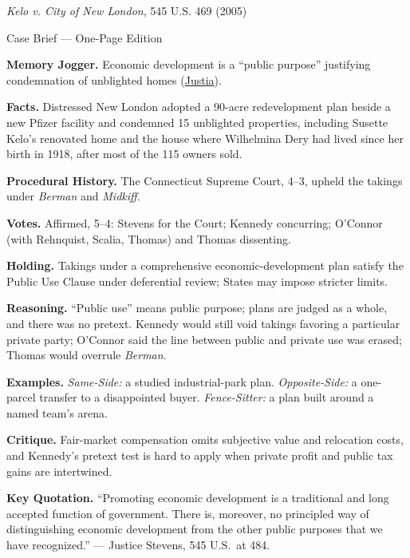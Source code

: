 \documentclass[12pt]{article}
\begin{document}
\begin{center}
{\Large \textit{Kelo v. City of New London}, 545 U.S. 469 (2005)\par}
\vspace{0.3em}
{\normalsize Case Brief --- One-Page Edition\par}
\end{center}

\textbf{Memory Jogger.} Economic development is a ``public purpose'' justifying condemnation of unblighted homes (\href{https://supreme.justia.com/cases/federal/us/545/469/}{Justia}).

\textbf{Facts.} Distressed New London adopted a 90-acre redevelopment plan beside a new Pfizer facility and condemned 15 unblighted properties, including Susette Kelo's renovated home and the house where Wilhelmina Dery had lived since her birth in 1918, after most of the 115 owners sold.

\textbf{Procedural History.} The Connecticut Supreme Court, 4--3, upheld the takings under \textit{Berman} and \textit{Midkiff}.

\textbf{Votes.} Affirmed, 5--4: Stevens for the Court; Kennedy concurring; O'Connor (with Rehnquist, Scalia, Thomas) and Thomas dissenting.

\textbf{Holding.} Takings under a comprehensive economic-development plan satisfy the Public Use Clause under deferential review; States may impose stricter limits.

\textbf{Reasoning.} ``Public use'' means public purpose; plans are judged as a whole, and there was no pretext. Kennedy would still void takings favoring a particular private party; O'Connor said the line between public and private use was erased; Thomas would overrule \textit{Berman}.

\textbf{Examples.} \emph{Same-Side:} a studied industrial-park plan. \emph{Opposite-Side:} a one-parcel transfer to a disappointed buyer. \emph{Fence-Sitter:} a plan built around a named team's arena.

\textbf{Critique.} Fair-market compensation omits subjective value and relocation costs, and Kennedy's pretext test is hard to apply when private profit and public tax gains are intertwined.

\textbf{Key Quotation.} ``Promoting economic development is a traditional and long accepted function of government. There is, moreover, no principled way of distinguishing economic development from the other public purposes that we have recognized.'' --- Justice Stevens, 545 U.S.\ at 484.
\end{document}

